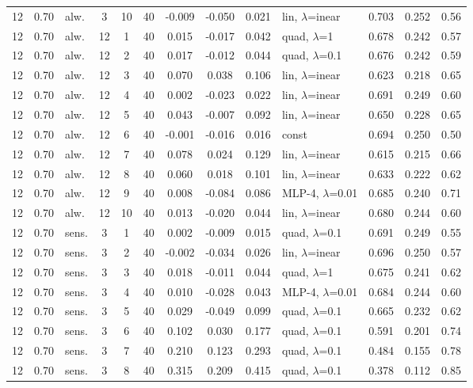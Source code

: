 \begin{scriptsize}
\begin{longtable}{cclcc c ccc l ccc}
12 & 0.70 & alw. & 3 & 10 & 40 & -0.009 & -0.050 & 0.021 & lin, $\lambda$=inear & 0.703 & 0.252 & 0.56 \\
12 & 0.70 & alw. & 12 & 1 & 40 & 0.015 & -0.017 & 0.042 & quad, $\lambda$=1 & 0.678 & 0.242 & 0.57 \\
12 & 0.70 & alw. & 12 & 2 & 40 & 0.017 & -0.012 & 0.044 & quad, $\lambda$=0.1 & 0.676 & 0.242 & 0.59 \\
12 & 0.70 & alw. & 12 & 3 & 40 & 0.070 & 0.038 & 0.106 & lin, $\lambda$=inear & 0.623 & 0.218 & 0.65 \\
12 & 0.70 & alw. & 12 & 4 & 40 & 0.002 & -0.023 & 0.022 & lin, $\lambda$=inear & 0.691 & 0.249 & 0.60 \\
12 & 0.70 & alw. & 12 & 5 & 40 & 0.043 & -0.007 & 0.092 & lin, $\lambda$=inear & 0.650 & 0.228 & 0.65 \\
12 & 0.70 & alw. & 12 & 6 & 40 & -0.001 & -0.016 & 0.016 & const & 0.694 & 0.250 & 0.50 \\
12 & 0.70 & alw. & 12 & 7 & 40 & 0.078 & 0.024 & 0.129 & lin, $\lambda$=inear & 0.615 & 0.215 & 0.66 \\
12 & 0.70 & alw. & 12 & 8 & 40 & 0.060 & 0.018 & 0.101 & lin, $\lambda$=inear & 0.633 & 0.222 & 0.62 \\
12 & 0.70 & alw. & 12 & 9 & 40 & 0.008 & -0.084 & 0.086 & MLP-4, $\lambda$=0.01 & 0.685 & 0.240 & 0.71 \\
12 & 0.70 & alw. & 12 & 10 & 40 & 0.013 & -0.020 & 0.044 & lin, $\lambda$=inear & 0.680 & 0.244 & 0.60 \\
12 & 0.70 & sens. & 3 & 1 & 40 & 0.002 & -0.009 & 0.015 & quad, $\lambda$=0.1 & 0.691 & 0.249 & 0.55 \\
12 & 0.70 & sens. & 3 & 2 & 40 & -0.002 & -0.034 & 0.026 & lin, $\lambda$=inear & 0.696 & 0.250 & 0.57 \\
12 & 0.70 & sens. & 3 & 3 & 40 & 0.018 & -0.011 & 0.044 & quad, $\lambda$=1 & 0.675 & 0.241 & 0.62 \\
12 & 0.70 & sens. & 3 & 4 & 40 & 0.010 & -0.028 & 0.043 & MLP-4, $\lambda$=0.01 & 0.684 & 0.244 & 0.60 \\
12 & 0.70 & sens. & 3 & 5 & 40 & 0.029 & -0.049 & 0.099 & quad, $\lambda$=0.1 & 0.665 & 0.232 & 0.62 \\
12 & 0.70 & sens. & 3 & 6 & 40 & 0.102 & 0.030 & 0.177 & quad, $\lambda$=0.1 & 0.591 & 0.201 & 0.74 \\
12 & 0.70 & sens. & 3 & 7 & 40 & 0.210 & 0.123 & 0.293 & quad, $\lambda$=0.1 & 0.484 & 0.155 & 0.78 \\
12 & 0.70 & sens. & 3 & 8 & 40 & 0.315 & 0.209 & 0.415 & quad, $\lambda$=0.1 & 0.378 & 0.112 & 0.85 \\

\end{longtable}
\end{scriptsize}
